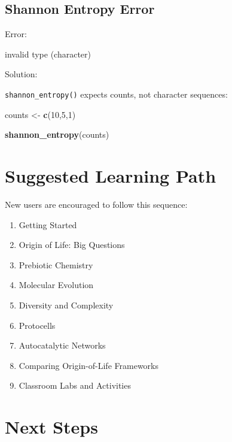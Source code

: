 \documentclass[
  oneside,
  openany]{book}
\newenvironment{Shaded}{\begin{snugshade}}{\end{snugshade}}
\newcommand{\DecValTok}[1]{\textcolor[rgb]{0.00,0.00,0.81}{#1}}
\newcommand{\FunctionTok}[1]{\textcolor[rgb]{0.13,0.29,0.53}{\textbf{#1}}}
\newcommand{\NormalTok}[1]{#1}
\newcommand{\OtherTok}[1]{\textcolor[rgb]{0.56,0.35,0.01}{#1}}
\newcommand{\StringTok}[1]{\textcolor[rgb]{0.31,0.60,0.02}{#1}}
\providecommand{\tightlist}{%
  \setlength{\itemsep}{0pt}\setlength{\parskip}{0pt}}
\begin{document}
\subsection{Shannon Entropy Error}\label{shannon-entropy-error}

Error:

\begin{Shaded}
\begin{Highlighting}[]
\NormalTok{invalid }\StringTok{\textquotesingle{}type\textquotesingle{}}\NormalTok{ (character)}
\end{Highlighting}
\end{Shaded}

Solution:

\texttt{shannon\_entropy()} expects counts, not character sequences:

\begin{Shaded}
\begin{Highlighting}[]
\NormalTok{counts }\OtherTok{\textless{}{-}} \FunctionTok{c}\NormalTok{(}\DecValTok{10}\NormalTok{,}\DecValTok{5}\NormalTok{,}\DecValTok{1}\NormalTok{)}

\FunctionTok{shannon\_entropy}\NormalTok{(counts)}
\end{Highlighting}
\end{Shaded}

\section{Suggested Learning Path}\label{suggested-learning-path}

New users are encouraged to follow this sequence:

\begin{enumerate}
\def\labelenumi{\arabic{enumi}.}
\tightlist
\item
  Getting Started
\item
  Origin of Life: Big Questions
\item
  Prebiotic Chemistry
\item
  Molecular Evolution
\item
  Diversity and Complexity
\item
  Protocells
\item
  Autocatalytic Networks
\item
  Comparing Origin-of-Life Frameworks
\item
  Classroom Labs and Activities
\end{enumerate}

\section{Next Steps}\label{next-steps}
\end{document}
